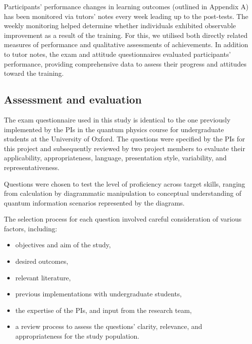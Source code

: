Participants’ performance changes in learning outcomes (outlined in Appendix A) has been monitored via tutors' notes every week leading up to the post-tests. The weekly monitoring helped determine whether individuals exhibited observable improvement as a result of the training. For this, we utilised both directly related measures of performance and qualitative assessments of achievements. 
In addition to tutor notes, the exam and attitude questionnaires evaluated participants’ performance, providing comprehensive data to assess their progress and attitudes toward the training.  

\subsection {Assessment and evaluation}

The exam questionnaire used in this study is identical to the one previously implemented by the PIs in the quantum physics course for undergraduate students at the University of Oxford.
The questions were specified by the PIs for this project and subsequently reviewed by two project members to evaluate their applicability, appropriateness, language, presentation style, variability, and representativeness.

Questions were chosen to test the level of proficiency across target skills, ranging from calculation by diagrammatic manipulation to conceptual understanding of quantum information scenarios represented by the diagrams.

The selection process for each question involved careful consideration of various factors, including: 
\begin{itemize}
    \item objectives and aim of the study,
    \item desired outcomes,
    \item relevant literature,
    \item previous implementations with undergraduate students,
    \item the expertise of the PIs, and input from the research team, 
    \item a review process to assess the questions' clarity, relevance, and appropriateness for the study population. 
\end{itemize}


